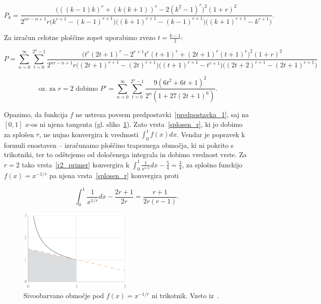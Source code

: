 \documentclass[a4paper, 12pt, titlepage]{article}
\begin{document}
\begin{equation*}
    P_k = \frac{
        \bigl(((k-1)k)^r + (k(k+1))^r - 2(k^2-1)^r\bigr)^2(1+r)^2
    }{
        2^{nr-n+1} r \bigl(k^{r+1} - (k-1)^{r+1}\bigr) \bigl((k+1)^{r+1} - (k-1)^{r+1}\bigr) \bigl((k+1)^{r+1} - k^{r+1}\bigr)
    }\text{.}
\end{equation*}

Za izračun celotne ploščine zopet uporabimo zvezo $ t = \frac{k-1}{2} $:

\begin{equation}
    P = \sum_{n=0}^{\infty} \sum_{t=0}^{2^n-1}
    \frac{
        \bigl(t^r (2t+1)^r - 2^{r+1} t^r (t+1)^r + (2t+1)^r(t+1)^r\bigr)^2(1+r)^2
    }{
        2^{nr-n+1}r
        \bigl((2t+1)^{r+1}-(2t)^{r+1}\bigr)
        \bigl((t + 1)^{r+1} - t^{r+1}\bigr)
        \bigl((2t + 2)^{r+1} - (2t+1)^{r+1}\bigr)
    }
    \label{splosen_r}
\end{equation}

\begin{equation}
    \text{ oz. za } r = 2 \text{ dobimo }
    P' = \sum_{n=0}^{\infty} \sum_{t=0}^{2^n-1} \frac{9(6t^2+6t+1)^2}{2^n(1+27(2t+1)^6)}\text{.}
    \label{r2_primer}
\end{equation}

Opazimo, da funkcija $ f $ ne ustreza povsem predpostavki~\ref{predpostavka_1}, saj na $ [0,1] $ $ x $-os ni njena tangenta (gl. sliko~\ref{r_funkcija}). Zato vrsta~\ref{splosen_r}, ki jo dobimo za splošen $ r $, ne nujno konvergira k vrednosti $ \int_{0}^{1}f(x)dx $. Vendar je popravek k formuli enostaven -- izračunamo ploščino trapeznega območja, ki ni pokrito s trikotniki, ter to odštejemo od določenega integrala in dobimo vrednost vrste. Za $ r = 2 $ tako vrsta~\ref{r2_primer} konvergira k $ \int_{0}^{1}\frac{1}{x^{1/2}}dx - \frac{5}{4} = \frac{3}{4} $, za splošno funckijo $ f(x)=x^{-1/r} $ pa njena vrsta~\ref{splosen_r} konvergira proti

\begin{equation*}
    \int_{0}^{1}\frac{1}{x^{1/r}}dx - \frac{2r+1}{2r} = \frac{r+1}{2r(r-1)}\text{.}
\end{equation*}

\begin{figure}[h!]
    \centering
    \includegraphics[width=0.5\textwidth]{slike/r_funkcija.png}
    \caption{Sivoobarvano območje pod $ f(x) = x^{-1/r} $ ni trikotnik. Vzeto iz~\cite{osnovni_clanek}.}
    \label{r_funkcija}
\end{figure}
\end{document}
